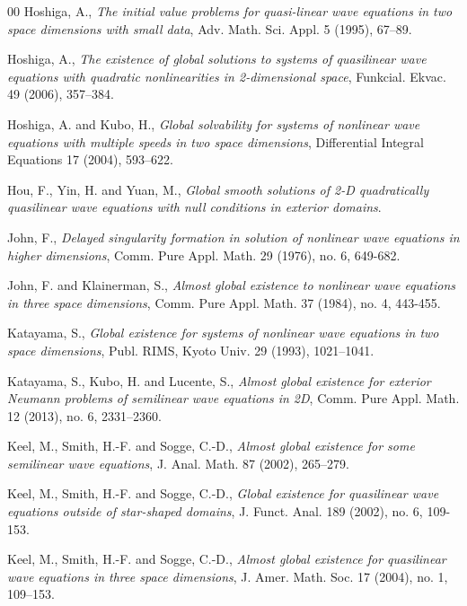 \documentclass[11pt, reqno]{amsart}
\theoremstyle{definition}
\theoremstyle{remark}
\theoremstyle{definition}
\numberwithin{equation}{section}
\numberwithin{equation}{section}
\begin{document}
\begin{thebibliography}{00}
{Hoshiga, A.}, \textit{\emph The initial value problems for
quasi-linear wave equations in two space dimensions with small
data}, Adv. Math. Sci. Appl. 5 (1995), 67--89.

{Hoshiga, A.}, \textit{\emph The existence of global solutions to
systems of quasilinear wave equations with quadratic nonlinearities
in 2-dimensional space}, Funkcial. Ekvac. 49 (2006), 357--384.

{Hoshiga, A. and Kubo, H.}, \textit{\emph Global solvability for
systems of nonlinear wave equations with multiple speeds in two
space dimensions}, Differential Integral Equations 17 (2004),
593--622.

{Hou, F., Yin, H. and Yuan, M.}, \textit{\emph Global smooth solutions of 2-D quadratically quasilinear wave equations with null conditions in exterior 
domains}.

{John, F.}, \textit{\emph Delayed singularity formation in solution of nonlinear wave equations in higher
dimensions}, Comm. Pure Appl. Math. 29 (1976), no. 6, 649-682.

{John, F. and Klainerman, S.}, \textit{\emph Almost global existence to nonlinear wave equations in three space dimensions}, Comm. Pure Appl. Math. 37 (1984), 
no. 4, 443-455.



{Katayama, S.}, \textit{\emph Global existence for systems of
nonlinear wave equations in two space dimensions}, Publ. RIMS, Kyoto
Univ. 29 (1993), 1021--1041.

{Katayama, S., Kubo, H. and Lucente, S.}, \textit{\emph Almost global existence for exterior Neumann problems of
semilinear wave equations in 2D},  Comm. Pure Appl. Math. 12 (2013), no. 6, 2331--2360.




{Keel, M., Smith, H.-F. and  Sogge, C.-D.}, \textit{\emph Almost
global existence for some semilinear wave equations}, J. Anal. Math.
87 (2002), 265--279.

{Keel, M., Smith, H.-F. and  Sogge, C.-D.}, \textit{\emph Global existence for quasilinear wave equations outside of star-shaped domains},
J. Funct. Anal. 189 (2002), no. 6, 109-153.


{Keel, M., Smith, H.-F. and Sogge, C.-D.}, \textit{\emph Almost
global existence for quasilinear wave equations in three space
dimensions}, J. Amer. Math. Soc. 17 (2004), no. 1, 109--153.


\end{thebibliography}
\end{document}
